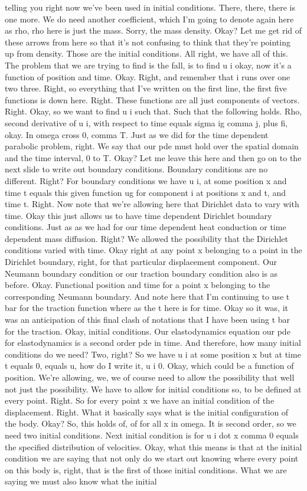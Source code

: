 \documentclass[10pt]{article}
\begin{document}
telling you right now we've been used in initial conditions. There, there, there is one more. We do need another coefficient, which I'm going to denote again here as rho, rho here is just the mass. Sorry, the mass density. Okay? Let me get rid of these arrows from here so that it's not confusing to think that they're pointing up from density. Those are the initial conditions. All right, we have all of this. The problem that we are trying to find is the fall, is to find u i okay, now it's a function of position and time. Okay. Right, and remember that i runs over one two three. Right, so everything that I've written on the first line, the first five functions is down here. Right. These functions are all just components of vectors. Right. Okay, so we want to find u i such that. Such that the following holds. Rho, second derivative of u i, with respect to time equals sigma ig comma j, plus fi, okay. In omega cross 0, comma T. Just as we did for the time dependent parabolic problem, right. We say that our pde must hold over the spatial domain and the time interval, 0 to T. Okay? Let me leave this here and then go on to the next slide to write out boundary conditions. Boundary conditions are no different. Right? For boundary conditions we have u i, at some position x and time t equals this given function ug for component i at positions x and t, and time t. Right. Now note that we're allowing here that Dirichlet data to vary with time. Okay this just allows us to have time dependent Dirichlet boundary conditions. Just as as we had for our time dependent heat conduction or time dependent mass diffusion. Right? We allowed the possibility that the Dirichlet conditions varied with time. Okay right at any point x belonging to a point in the Dirichlet boundary, right, for that particular displacement component. Our Neumann boundary condition or our traction boundary condition also is as before. Okay. Functional position and time for a point x belonging to the corresponding Neumann boundary. And note here that I'm continuing to use t bar for the traction function where as the t here is for time. Okay so it was, it was an anticipation of this final clash of notations that I have been using t bar for the traction. Okay, initial conditions. Our elastodynamics equation our pde for elastodynamics is a second order pde in time. And therefore, how many initial conditions do we need? Two, right? So we have u i at some position x but at time t equals 0, equals u, how do I write it, u i 0. Okay, which could be a function of position. We're allowing, we, we of course need to allow the possibility that well not just the possibility. We have to allow for initial conditions so, to be defined at every point. Right. So for every point x we have an initial condition of the displacement. Right. What it basically says what is the initial configuration of the body. Okay? So, this holds of, of for all x in omega. It is second order, so we need two initial conditions. Next initial condition is for u i dot x comma 0 equals the specified distribution of velocities. Okay, what this means is that at the initial condition we are saying that not only do we start out knowing where every point on this body is, right, that is the first of those initial conditions. What we are saying we must also know what the initial 
\end{document}
